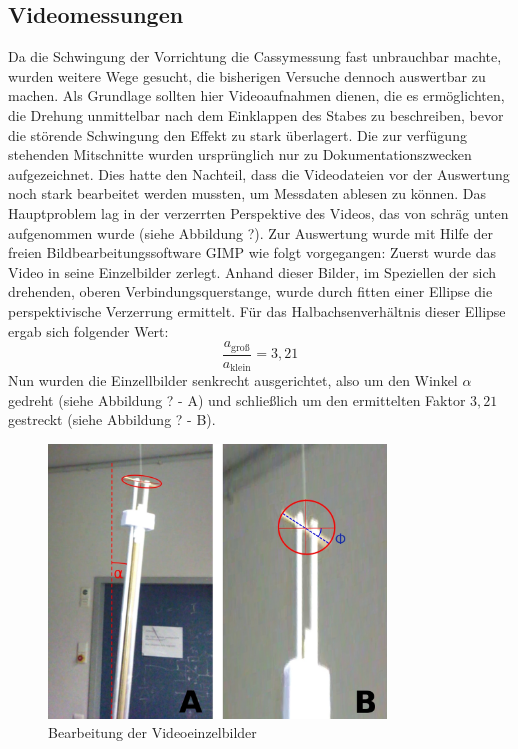 \documentclass[11pt]{scrartcl}
\begin{document}
\FloatBarrier
\subsection{Videomessungen} %
Da die Schwingung der Vorrichtung die Cassymessung fast unbrauchbar machte, wurden weitere Wege gesucht, die bisherigen Versuche dennoch auswertbar zu machen. Als Grundlage sollten hier Videoaufnahmen dienen, die es ermöglichten, die Drehung unmittelbar nach dem Einklappen des Stabes zu beschreiben, bevor die störende Schwingung den Effekt zu stark überlagert. Die zur verfügung stehenden Mitschnitte wurden ursprünglich nur zu Dokumentationszwecken aufgezeichnet. Dies hatte den Nachteil, dass die Videodateien vor der Auswertung noch stark bearbeitet werden mussten, um Messdaten ablesen zu können. Das Hauptproblem lag in der verzerrten Perspektive des Videos, das von schräg unten aufgenommen wurde (siehe Abbildung ?). Zur Auswertung wurde mit Hilfe der freien Bildbearbeitungssoftware GIMP wie folgt vorgegangen: Zuerst wurde das Video in seine Einzelbilder zerlegt. Anhand dieser Bilder, im Speziellen der sich drehenden, oberen Verbindungsquerstange, wurde durch fitten einer Ellipse die perspektivische Verzerrung ermittelt. Für das Halbachsenverhältnis dieser Ellipse ergab sich folgender Wert:
\[\frac{a_{\text{groß}}}{a_{\text{klein}}}=3,21\]
Nun wurden die Einzellbilder senkrecht ausgerichtet, also um den Winkel $\alpha$ gedreht (siehe Abbildung ? - A) und schließlich um den ermittelten Faktor $3,21$ gestreckt (siehe Abbildung ? - B).
\begin{figure}[h]
\begin{center}
\includegraphics[width=0.8\textwidth]{images/auswert.jpg}
\end{center}
\vspace{-1.5\baselineskip}
\caption{Bearbeitung der Videoeinzelbilder}
\label{Videobearbeitung}
\end{figure}
\end{document}
